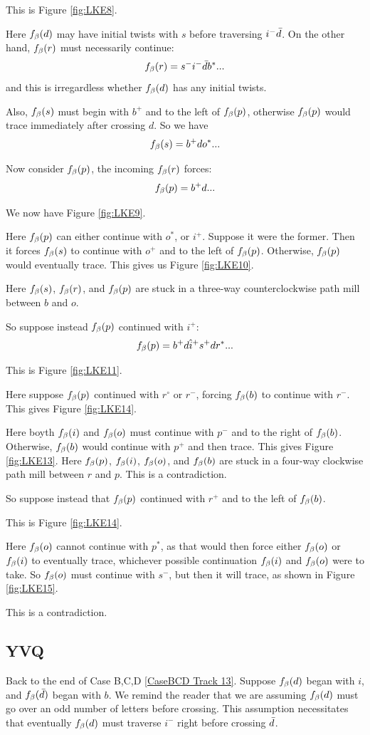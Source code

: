 This is Figure \ref{fig:LKE8}. 

Here $f_\beta(d)$ may have initial twists with $s$ before traversing $i^-\bar{d}$. On the other hand, $f_\beta(r)$ must necessarily continue:
\[
f_\beta(r) = s^- i^- \bar{d} b^*... 
\]
and this is irregardless whether $f_\beta(d)$ has any initial twists.

Also, $f_\beta(s)$ must begin with $b^+$ and to the left of $f_\beta(p)$, otherwise $f_\beta(p)$ would trace immediately after crossing $d$. So we have
\[
f_\beta(s) = b^+ d o^*...
\]

Now consider $f_\beta(p)$, the incoming $f_\beta(r)$ forces:
\[
f_\beta(p) = b^+ d...
\]

We now have Figure \ref{fig:LKE9}.

Here $f_\beta(p)$ can either continue with $o^*$, or $i^+$. Suppose it were the former. Then it forces $f_\beta(s)$ to continue with $o^+$ and to the left of $f_\beta(p)$. Otherwise, $f_\beta(p)$ would eventually trace. This gives us Figure \ref{fig:LKE10}.

Here $f_\beta(s)$, $f_\beta(r)$, and $f_\beta(p)$ are stuck in a three-way counterclockwise path mill between $b$ and $o$.

So suppose instead $f_\beta(p)$ continued with $i^+$:
\[
f_\beta(p) = b^+ d \hat{i}^+ s^+ d r^*...
\]

This is Figure \ref{fig:LKE11}.

Here suppose $f_\beta(p)$ continued with $r^\circ$ or $r^-$, forcing $f_\beta(b)$ to continue with $r^-$. This gives Figure \ref{fig:LKE14}.

Here boyth $f_\beta(i)$ and $f_\beta(o)$ must continue with $p^-$ and to the right of $f_\beta(b)$. Otherwise, $f_\beta(b)$ would continue with $p^+$ and then trace. This gives Figure \ref{fig:LKE13}. Here $f_\beta(p)$, $f_\beta(i)$, $f_\beta(o)$, and $f_\beta(b)$ are stuck in a four-way clockwise path mill between $r$ and $p$. This is a contradiction.

So suppose instead that $f_\beta(p)$ continued with $r^+$ and to the left of $f_\beta(b)$.

This is Figure \ref{fig:LKE14}.

Here $f_\beta(o)$ cannot continue with $p^*$, as that would then force either $f_\beta(o)$ or $f_\beta(i)$ to eventually trace, whichever possible continuation $f_\beta(i)$ and $f_\beta(o)$ were to take. So $f_\beta(o)$ must continue with $s^-$, but then it will trace, as shown in Figure \ref{fig:LKE15}.

This is a contradiction.

\subsection{YVQ}\label{YVQ}
Back to the end of Case B,C,D \ref{CaseBCD Track 13}.
Suppose $f_\beta(d)$ began with $i$, and $f_\beta(\bar{d})$ began with $b$. We remind the reader that we are assuming $f_\beta(d)$ must go over an odd number of letters before crossing. This assumption necessitates that eventually $f_\beta(d)$ must traverse $i^-$ right before crossing $\bar{d}$.

